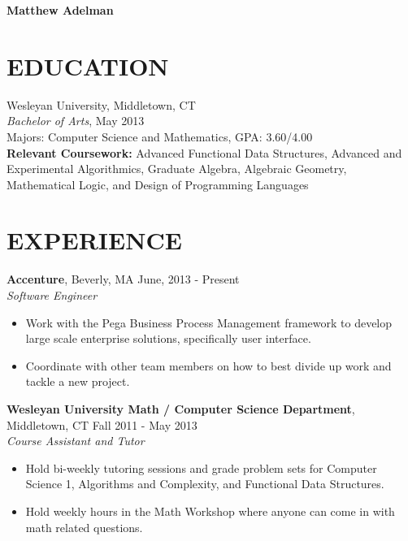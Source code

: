 \documentclass[11pt]{res} %
\begin{document}
 


{\bf\Large Matthew Adelman}

\address{27 Warner Street $\bullet$ Somerville, MA 02144   \\ 
        (201) 323-2719 $\bullet$ mxadelman@gmail.com $\bullet$ 
        http://madelman.org}

\address{}

\begin{resume}

\section{EDUCATION}
 \noindent Wesleyan University, Middletown, CT \\
{\it Bachelor of Arts}, May 2013 \\
Majors: Computer Science and Mathematics, GPA: 3.60/4.00 \\
{\bf Relevant Coursework:} Advanced Functional Data Structures, Advanced and 
Experimental Algorithmics, Graduate Algebra, Algebraic Geometry, Mathematical
Logic, and Design of Programming Languages

\section{EXPERIENCE}
{\bf Accenture}, Beverly, MA \hfill June, 2013 - Present \\
{\it Software Engineer} 
\vspace{0.01in} %
   \begin{itemize} \itemsep -2pt  %
   \item Work with the Pega Business Process Management framework to develop 
   large scale enterprise solutions,
   specifically user interface.
   \item Coordinate with other team members on how to best divide up work and
   tackle a new project.
   \end{itemize}


{\bf Wesleyan University Math / Computer Science Department}, Middletown, CT 
\hfill Fall 2011 - May 2013 \\ 
{\it Course Assistant and Tutor} \\
\vspace{-0.17in}
 \begin{itemize} \itemsep -2pt
   \item Hold bi-weekly tutoring sessions and grade problem sets for Computer
   Science 1, Algorithms and Complexity, and Functional Data Structures.  
   \item Hold weekly hours in the Math Workshop where anyone can come in with
   math related questions.  
   \end{itemize} 


\end{resume}
\end{document}
